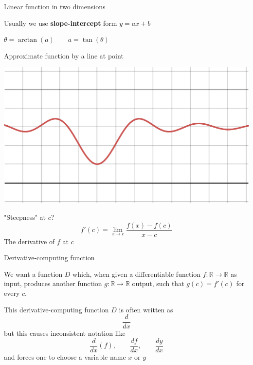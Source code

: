 \documentclass[12pt,aspectratio=169]{beamer}
\begin{document}
\begin{frame}{Linear function in two dimensions}

Usually we use \textbf{slope-intercept} form $y= a x + b$



$\theta = \arctan (a) \qquad a = \tan (\theta)$
	
\end{frame}



\begin{frame}{Approximate function by a line at point}


\includegraphics[width=0.7\linewidth]{img/desmos-graph1.pdf}




"Steepness" at $c$?
$$f'(c) = \lim_{x \to c} \frac{f(x) - f(c)}{x - c}$$
The derivative of $f$ at $c$





\end{frame}


\begin{frame}{Derivative-computing function}

We want a function $D$ which, when given a differentiable function $f : \mathbb{R} \to \mathbb{R}$ as input, produces another function $g : \mathbb{R} \to \mathbb{R}$ output, such that $g(c) = f'(c)$ for every $c$.

\bigskip
\pause
This derivative-computing function $D$ is often written as 
$$\frac{d}{dx}$$
but this causes inconsistent notation like
$$\frac{d}{dx}(f), \qquad \frac{df}{dx}, \qquad \frac{dy}{dx}$$
and forces one to choose a variable name $x$ or $y$
	
\end{frame}
\end{document}

